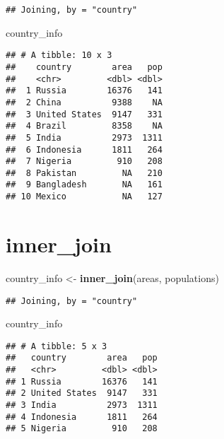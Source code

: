 \documentclass[]{book}
\newenvironment{Shaded}{\begin{snugshade}}{\end{snugshade}}
\newcommand{\KeywordTok}[1]{\textcolor[rgb]{0.13,0.29,0.53}{\textbf{#1}}}
\newcommand{\NormalTok}[1]{#1}
\newcommand{\StringTok}[1]{\textcolor[rgb]{0.31,0.60,0.02}{#1}}
\begin{document}
\begin{verbatim}
## Joining, by = "country"
\end{verbatim}

\begin{Shaded}
\begin{Highlighting}[]
\NormalTok{country_info}
\end{Highlighting}
\end{Shaded}

\begin{verbatim}
## # A tibble: 10 x 3
##    country        area   pop
##    <chr>         <dbl> <dbl>
##  1 Russia        16376   141
##  2 China          9388    NA
##  3 United States  9147   331
##  4 Brazil         8358    NA
##  5 India          2973  1311
##  6 Indonesia      1811   264
##  7 Nigeria         910   208
##  8 Pakistan         NA   210
##  9 Bangladesh       NA   161
## 10 Mexico           NA   127
\end{verbatim}

\hypertarget{innerjoin}{%
\section*{\texorpdfstring{\textbf{inner\_join}}{inner\_join}}\label{innerjoin}}

\begin{Shaded}
\begin{Highlighting}[]
\NormalTok{country_info <-}\StringTok{ }\KeywordTok{inner_join}\NormalTok{(areas, populations)}
\end{Highlighting}
\end{Shaded}

\begin{verbatim}
## Joining, by = "country"
\end{verbatim}

\begin{Shaded}
\begin{Highlighting}[]
\NormalTok{country_info}
\end{Highlighting}
\end{Shaded}

\begin{verbatim}
## # A tibble: 5 x 3
##   country        area   pop
##   <chr>         <dbl> <dbl>
## 1 Russia        16376   141
## 2 United States  9147   331
## 3 India          2973  1311
## 4 Indonesia      1811   264
## 5 Nigeria         910   208
\end{verbatim}
\end{document}
